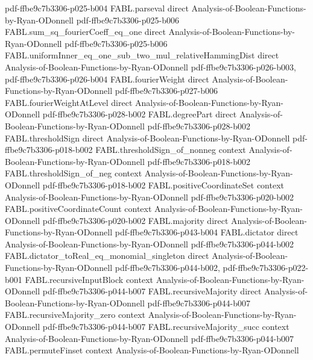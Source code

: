 \begin{theorem}
  {pdf-ffbe9c7b3306-p025-b004}
\proofstep
  {FABL.parseval}
  {direct}
  {Analysis-of-Boolean-Functions-by-Ryan-ODonnell}
  {pdf-ffbe9c7b3306-p025-b006}
\proofstep
  {FABL.sum_sq_fourierCoeff_eq_one}
  {direct}
  {Analysis-of-Boolean-Functions-by-Ryan-ODonnell}
  {pdf-ffbe9c7b3306-p025-b006}
\proofstep
  {FABL.uniformInner_eq_one_sub_two_mul_relativeHammingDist}
  {direct}
  {Analysis-of-Boolean-Functions-by-Ryan-ODonnell}
  {pdf-ffbe9c7b3306-p026-b003,
    pdf-ffbe9c7b3306-p026-b004}
\proofstep
  {FABL.fourierWeight}
  {direct}
  {Analysis-of-Boolean-Functions-by-Ryan-ODonnell}
  {pdf-ffbe9c7b3306-p027-b006}
\proofstep
  {FABL.fourierWeightAtLevel}
  {direct}
  {Analysis-of-Boolean-Functions-by-Ryan-ODonnell}
  {pdf-ffbe9c7b3306-p028-b002}
\proofstep
  {FABL.degreePart}
  {direct}
  {Analysis-of-Boolean-Functions-by-Ryan-ODonnell}
  {pdf-ffbe9c7b3306-p028-b002}
\proofstep
  {FABL.thresholdSign}
  {direct}
  {Analysis-of-Boolean-Functions-by-Ryan-ODonnell}
  {pdf-ffbe9c7b3306-p018-b002}
\proofstep
  {FABL.thresholdSign_of_nonneg}
  {context}
  {Analysis-of-Boolean-Functions-by-Ryan-ODonnell}
  {pdf-ffbe9c7b3306-p018-b002}
\proofstep
  {FABL.thresholdSign_of_neg}
  {context}
  {Analysis-of-Boolean-Functions-by-Ryan-ODonnell}
  {pdf-ffbe9c7b3306-p018-b002}
\proofstep
  {FABL.positiveCoordinateSet}
  {context}
  {Analysis-of-Boolean-Functions-by-Ryan-ODonnell}
  {pdf-ffbe9c7b3306-p020-b002}
\proofstep
  {FABL.positiveCoordinateCount}
  {context}
  {Analysis-of-Boolean-Functions-by-Ryan-ODonnell}
  {pdf-ffbe9c7b3306-p020-b002}
\proofstep
  {FABL.majority}
  {direct}
  {Analysis-of-Boolean-Functions-by-Ryan-ODonnell}
  {pdf-ffbe9c7b3306-p043-b004}
\proofstep
  {FABL.dictator}
  {direct}
  {Analysis-of-Boolean-Functions-by-Ryan-ODonnell}
  {pdf-ffbe9c7b3306-p044-b002}
\proofstep
  {FABL.dictator_toReal_eq_monomial_singleton}
  {direct}
  {Analysis-of-Boolean-Functions-by-Ryan-ODonnell}
  {pdf-ffbe9c7b3306-p044-b002,
    pdf-ffbe9c7b3306-p022-b001}
\proofstep
  {FABL.recursiveInputBlock}
  {context}
  {Analysis-of-Boolean-Functions-by-Ryan-ODonnell}
  {pdf-ffbe9c7b3306-p044-b007}
\proofstep
  {FABL.recursiveMajority}
  {direct}
  {Analysis-of-Boolean-Functions-by-Ryan-ODonnell}
  {pdf-ffbe9c7b3306-p044-b007}
\proofstep
  {FABL.recursiveMajority_zero}
  {context}
  {Analysis-of-Boolean-Functions-by-Ryan-ODonnell}
  {pdf-ffbe9c7b3306-p044-b007}
\proofstep
  {FABL.recursiveMajority_succ}
  {context}
  {Analysis-of-Boolean-Functions-by-Ryan-ODonnell}
  {pdf-ffbe9c7b3306-p044-b007}
\proofstep
  {FABL.permuteFinset}
  {context}
  {Analysis-of-Boolean-Functions-by-Ryan-ODonnell}

\end{theorem}
